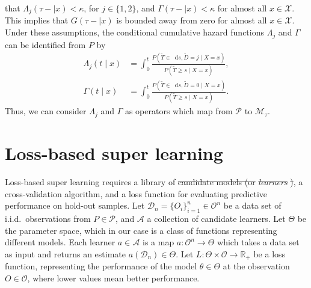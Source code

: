 \documentclass[lineno]{biometrika}
\newcommand{\R}{\mathbb{R}}
\newcommand*\diff{\mathop{}\!\mathrm{d}}
\newcommand{\1}{\mathds{1}}
\newcommand{\data}{\ensuremath{\mathcal{D}}}
\providecommand{\DIFadd}[1]{{\protect\color{blue}\uwave{#1}}} %
\providecommand{\DIFdel}[1]{{\protect\color{red}\sout{#1}}}                      %
\providecommand{\DIFaddbegin}{} %
\providecommand{\DIFaddend}{} %
\providecommand{\DIFdelbegin}{} %
\providecommand{\DIFdelend}{} %
\begin{document}
that \(\Lambda_{j}(\tau- \mid x)<\kappa \), for \(j\in\{1,2\}\), and
\(\Gamma(\tau- \mid x)<\kappa\) for almost all \(x\in\mathcal
X\). This implies that \(G(\tau- \mid x)\) is bounded away
from zero for almost all \(x\in\mathcal X\).  Under these assumptions,
the conditional cumulative hazard functions \(\Lambda_{j}\) and
\(\Gamma\) can be identified from \(P\) by
\begin{align}
  \Lambda_{j}(t \mid x) &= \int_0^t\frac{  P(\tilde T \in \diff s, \tilde D=j \mid X=x )}{P(\tilde T \geq s \mid X=x )}, \label{eq:lambdaj}\\
  \Gamma(t \mid x) &= \int_0^t\frac{  P(\tilde T \in \diff s, \tilde D=0 \mid X=x )}{P(\tilde T \geq s \mid X=x )}\label{eq:gamma}.
\end{align}
Thus, we can consider $\Lambda_j$ and \(\Gamma\) as operators which map from
\( \mathcal{P} \) to \(\mathcal M_{\tau}\).

\section{Loss-based super learning}
\label{sec:super-learning}

Loss-based super learning requires a library of \DIFdelbegin \DIFdel{candidate models (or
}\textit{\DIFdel{learners}}%
\DIFdel{)}\DIFdelend \DIFaddbegin \DIFadd{learners}\DIFaddend , a
cross-validation algorithm, and a loss function for evaluating
predictive performance on hold-out samples. Let \(
\data_n=\{O_i\}_{i=1}^n \in \mathcal{O}^n \) be a data set of i.i.d.\
observations from \( P \in \mathcal{P} \), and $\mathcal{A}$ a
collection of candidate learners. Let \(\Theta\) be the parameter
space, which in our case is a class of functions representing
different models. Each learner \(a \in \mathcal{A}\) is a map \( a
\colon \mathcal{O}^n \rightarrow \Theta \) which takes a data set as
input and returns an estimate $a(\data_n) \in \Theta$. Let \(L\colon
\Theta \times \mathcal{O} \rightarrow \R_+\) be a loss function,
representing the performance of the model $\theta \in \Theta$ at the
observation \( O \in \mathcal{O} \), where lower values mean better
performance.
\end{document}
